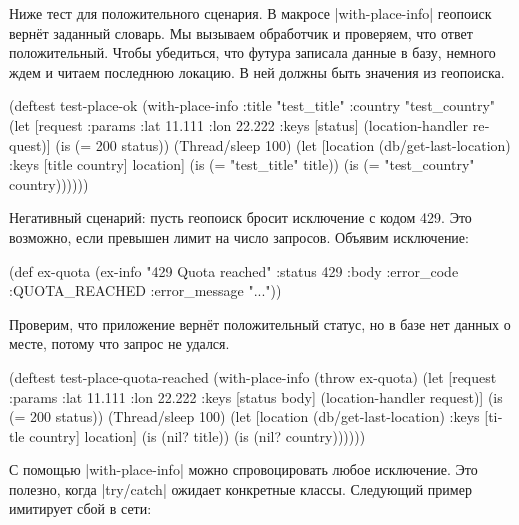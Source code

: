 Ниже тест для положительного сценария. В макросе \spverb|with-place-info|
геопоиск верн\"{е}т заданный словарь. Мы вызываем обработчик и проверяем, что ответ
положительный. Чтобы убедиться, что футура записала данные в базу, немного ждем
и читаем последнюю локацию. В ней должны быть значения из геопоиска.

\begin{english}
  \begin{clojure}
(deftest test-place-ok
  (with-place-info
    {:title "test_title"
     :country "test_country"}
    (let [request {:params {:lat 11.111 :lon 22.222}}
          {:keys [status]} (location-handler request)]
      (is (= 200 status))
      (Thread/sleep 100)
      (let [location (db/get-last-location)
            {:keys [title country]} location]
        (is (= "test_title" title))
        (is (= "test_country" country))))))
  \end{clojure}
\end{english}


Негативный сценарий: пусть геопоиск бросит исключение с кодом 429. Это
возможно, если превышен лимит на число запросов. Объявим исключение:

\begin{english}
  \begin{clojure}
(def ex-quota
  (ex-info "429 Quota reached"
           {:status 429
            :body {:error_code :QUOTA_REACHED
                   :error_message "..."}}))
  \end{clojure}
\end{english}

\noindent
Проверим, что приложение верн\"{е}т положительный статус, но в базе нет данных о
месте, потому что запрос не удался.

\begin{english}
  \begin{clojure}
(deftest test-place-quota-reached
  (with-place-info (throw ex-quota)
    (let [request {:params {:lat 11.111 :lon 22.222}}
          {:keys [status body]} (location-handler request)]
      (is (= 200 status))
      (Thread/sleep 100)
      (let [location (db/get-last-location)
            {:keys [title country]} location]
        (is (nil? title))
        (is (nil? country))))))
  \end{clojure}
\end{english}

С помощью \spverb|with-place-info| можно спровоцировать любое исключение. Это
полезно, когда \spverb|try/catch| ожидает конкретные классы. Следующий пример
имитирует сбой в сети:

